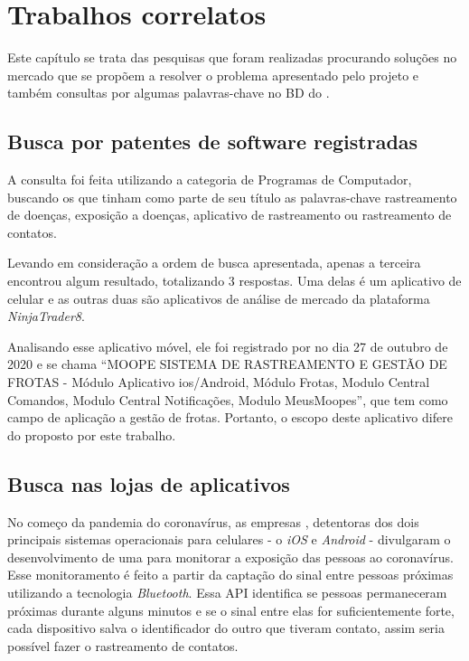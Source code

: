 \chapter{Trabalhos correlatos}\label{chp:correlatos}

Este capítulo se trata das pesquisas que foram realizadas procurando soluções no mercado que se propõem a resolver o problema apresentado pelo projeto e também consultas por algumas palavras-chave no BD do .

\section{Busca por patentes de software registradas}\label{sec:inpi}
A consulta foi feita utilizando a categoria de Programas de Computador, buscando os que tinham como parte de seu título as palavras-chave rastreamento de doenças, exposição a doenças, aplicativo de rastreamento ou rastreamento de contatos.

Levando em consideração a ordem de busca apresentada, apenas a terceira encontrou algum resultado, totalizando 3 respostas. Uma delas é um aplicativo de celular e as outras duas são aplicativos de análise de mercado da plataforma \textit{NinjaTrader8}.

Analisando esse aplicativo móvel, ele foi registrado por \textcite{moope} no dia 27 de outubro de 2020 e se chama “MOOPE SISTEMA DE RASTREAMENTO E GESTÃO DE FROTAS - Módulo Aplicativo ios/Android, Módulo Frotas, Modulo Central Comandos, Modulo Central Notificações, Modulo MeusMoopes”, que tem como campo de aplicação a gestão de frotas. Portanto, o escopo deste aplicativo difere do proposto por este trabalho.

\section{Busca nas lojas de aplicativos}\label{sec:mercado}
No começo da pandemia do coronavírus, as empresas \textcite{GoogleApple2020}, detentoras dos dois principais sistemas operacionais para celulares - o \textit{iOS} e \textit{Android} - divulgaram o desenvolvimento de uma  para monitorar a exposição das pessoas ao coronavírus. Esse monitoramento é feito a partir da captação do sinal entre pessoas próximas utilizando a tecnologia \textit{Bluetooth}. Essa API identifica se pessoas permaneceram próximas durante alguns minutos e se o sinal entre elas for suficientemente forte, cada dispositivo salva o identificador do outro que tiveram contato, assim seria possível fazer o rastreamento de contatos.

